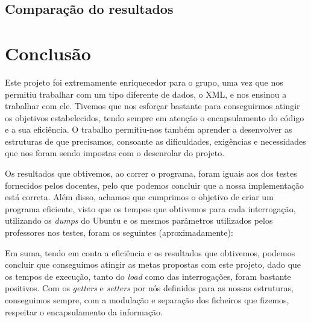 \documentclass[a4paper, 11pt, oneside]{article}
\begin{document}
\subsection{Comparação do resultados}






\section{Conclusão}




Este projeto foi extremamente enriquecedor para o grupo, uma vez que nos permitiu trabalhar com um tipo diferente de dados, o XML, e nos ensinou a trabalhar com ele. 
Tivemos que nos esforçar bastante para conseguirmos atingir os objetivos estabelecidos, tendo sempre em atenção o encapsulamento do código e a sua eficiência. O trabalho 
permitiu-nos também aprender a desenvolver as estruturas de que precisamos, consoante as dificuldades, exigências e necessidades que nos foram sendo impostas com o 
desenrolar do projeto.

Os resultados que obtivemos, ao correr o programa, foram iguais aos dos testes fornecidos pelos docentes, pelo que podemos concluir que a nossa implementação está correta. 
Além disso, achamos que cumprimos o objetivo de criar um programa eficiente, visto que os tempos que obtivemos para cada interrogação, utilizando os \textit{dumps} do 
Ubuntu e os mesmos parâmetros utilizados pelos professores nos testes, foram os seguintes (aproximadamente):


Em suma, tendo em conta a eficiência e os resultados que obtivemos, podemos concluir que conseguimos atingir as metas propostas com este projeto, dado que os tempos de 
execução, tanto do \textit{load} como das interrogações, foram bastante positivos. Com os \textit{getters} e \textit{setters} por nós definidos para as nossas estruturas, 
conseguimos sempre, com a modulação e separação dos ficheiros que fizemos, respeitar o encapsulamento da informação.
\end{document}
